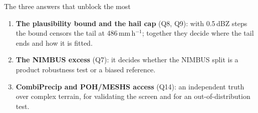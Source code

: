 \documentclass[aspectratio=169,10pt]{beamer}
\newcommand{\mmh}{\,mm\,h$^{-1}$}
\begin{document}
\begin{frame}{The three answers that unblock the most}
  \small
  \begin{enumerate}
    \item \textbf{The plausibility bound and the hail cap} (Q8, Q9): with 0.5\,dBZ steps the
      bound censors the tail at 486\mmh; together they decide where the tail ends and how it is
      fitted.
    \item \textbf{The NIMBUS excess} (Q7): it decides whether the NIMBUS split is a product
      robustness test or a biased reference.
    \item \textbf{CombiPrecip and POH/MESHS access} (Q14): an independent truth over
      complex terrain, for validating the screen and for an out-of-distribution test.
  \end{enumerate}
\end{frame}
\end{document}
